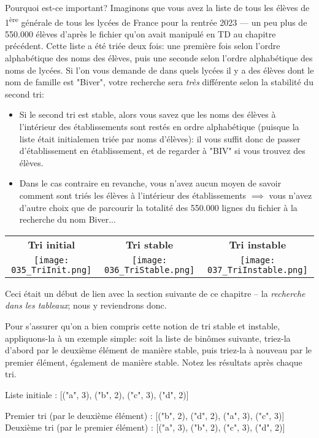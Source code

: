 \documentclass[12pt]{article}
\begin{document}
	Pourquoi est-ce important? Imaginons que vous avez la liste de tous les élèves de 1\textsuperscript{ère} générale de tous les lycées de France pour la rentrée 2023 --- un peu plus de 550.000 élèves d'après le fichier qu'on avait manipulé en TD au chapitre précédent. Cette liste a été triée deux fois: une première fois selon l'ordre alphabétique des noms des élèves, puis une seconde selon l'ordre alphabétique des noms de lycées. Si l'on vous demande de dans quels lycées il y a des élèves dont le nom de famille est "Biver", votre recherche sera \textit{très} différente selon la stabilité du second tri:
	\begin{itemize}
		\item Si le second tri est stable, alors vous savez que les noms des élèves à l'intérieur des établissements sont restés en ordre alphabétique (puisque la liste était initialemen triée par noms d'élèves): il vous suffit donc de passer d'établissement en établissement, et de regarder à "BIV" si vous trouvez des élèves.
		\item Dans le cas contraire en revanche, vous n'avez aucun moyen de savoir comment sont triés les élèves à l'intérieur des établissements $\implies$ vous n'avez d'autre choix que de parcourir la totalité des 550.000 lignes du fichier à la recherche du nom Biver...
	\end{itemize}
	
	\begin{center}
		\begin{tabular}{c c c}
			\textbf{Tri initial} & \textbf{Tri stable} & \textbf{Tri instable} \\
			\texttt{[image: 035\_TriInit.png]} & \texttt{[image: 036\_TriStable.png]}  &
			\texttt{[image: 037\_TriInstable.png]}
		\end{tabular}
	\end{center}
	
	Ceci était un début de lien avec la section suivante de ce chapitre -- la \textit{recherche dans les tableaux}; nous y reviendrons donc.
	
	\begin{MonExo}
		Pour s'assurer qu'on a bien compris cette notion de tri stable et instable, appliquons-la à un exemple simple: soit la liste de binômes suivante, triez-la d'abord par le deuxième élément de manière stable, puis triez-la à nouveau par le premier élément, également de manière stable. Notez les résultats après chaque tri.
		
		Liste initiale : [("a", 3), ("b", 2), ("c", 3), ("d", 2)]
	\end{MonExo}
	\begin{MaReponse}
		Premier tri (par le deuxième élément) : [("b", 2), ("d", 2), ("a", 3), ("c", 3)]
		Deuxième tri (par le premier élément) : [("a", 3), ("b", 2), ("c", 3), ("d", 2)]
	\end{MaReponse}
\end{document}
